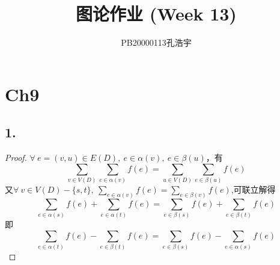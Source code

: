 \documentclass{article}
\title{图论作业 (Week 13)}
\author{PB20000113孔浩宇}
\begin{document}
\maketitle
\section*{Ch9}
\subsection*{1.}
\begin{proof}
    $\forall\ e=(v,u)\in E(D),\ e\in \alpha(v),\ e\in \beta(u) $，有
    \[
        \sum\limits_{v\in V(D)} \sum\limits_{e\in \alpha(v)} f(e)
        =
        \sum\limits_{u\in V(D)} \sum\limits_{e\in \beta(u)} f(e)
    \]
    又$\forall\ v\in V(D)-\{s,t\},\ \sum\limits_{e\in \alpha(v)} f(e) = \sum\limits_{e\in \beta(v)} f(e)$,可联立解得
    \[
        \sum\limits_{e\in \alpha(s)} f(e) + \sum\limits_{e\in \alpha(t)} f(e)
        =
        \sum\limits_{e\in \beta(s)} f(e) + \sum\limits_{e\in \beta(t)} f(e)
    \]
    即
    \[
        \sum\limits_{e\in \alpha(t)} f(e) - \sum\limits_{e\in \beta(t)} f(e)
        =
        \sum\limits_{e\in \beta(s)} f(e) - \sum\limits_{e\in \alpha(s)} f(e)
    \]
\end{proof}
\end{document}
